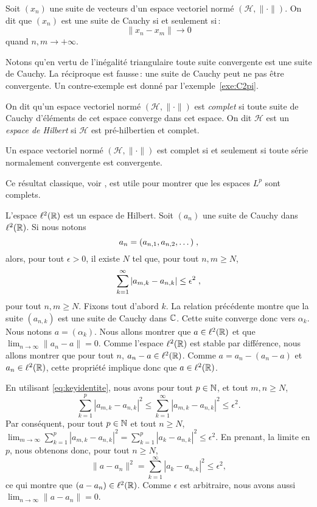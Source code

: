 \begin{definition}
  Soit $(x_n)$ une suite de vecteurs d'un espace vectoriel norm\'{e}
  $(\mathcal{H},\|\cdot\|)$. On dit que $(x_n)$ est une suite de Cauchy si et
  seulement si\,:
$$
\| x_n - x_m\| \rightarrow 0
$$
quand $n,m \rightarrow +\infty$.
\end{definition}
Notons qu'en vertu de l'in\'{e}galit\'{e} triangulaire toute suite
convergente est une suite de Cauchy. La r\'{e}ciproque est fausse\,:
une suite de Cauchy peut ne pas \^{e}tre convergente. Un
contre-exemple est donn\'{e} par l'exemple~\ref{exe:C2pi}.
\begin{definition}
  On dit qu'un espace vectoriel norm\'{e} $(\mathcal{H},\|\cdot\|)$ est
  \emph{complet} si toute suite de Cauchy d'\'{e}l\'{e}ments de cet espace converge
  dans cet espace. On dit $\mathcal{H}$ est un \emph{espace de Hilbert} si
  $\mathcal{H}$ est pr\'{e}-hilbertien et complet.
\end{definition}
\begin{proposition}
Un espace vectoriel norm\'{e} $(\mathcal{H},\|\cdot\|)$ est complet si et seulement
si toute s\'{e}rie normalement convergente est convergente.
\end{proposition}
Ce r\'{e}sultat classique, voir  \cite[proposition~5 du chapitre~6,
page~124]{royden:1988}, est utile pour montrer que les espaces $L^p$ sont complets.
\begin{example}
L'espace $\ell^2(\mathbb{R})$ est un espace de Hilbert. Soit $(a_n)$ une suite de Cauchy dans $\ell^2(\mathbb{R})$. Si nous notons
\[
a_n= (a_{n,1}, a_{n,2}, \dots ) \;,
\]
alors, pour tout $\epsilon > 0$, il existe $N$ tel que, pour tout $n,m \geq N$,
\begin{equation}
\label{eq:keyidentite}
\sum_{k=1}^\infty |a_{m,k}- a_{n,k}| \leq \epsilon^2 \;,
\end{equation}
pour tout $n,m \geq N$. Fixons tout d'abord $k$. La relation pr\'{e}c\'{e}dente montre
que la suite $(a_{n,k})$ est une suite de Cauchy dans $\mathbb{C}$.  Cette suite
converge donc vers $\alpha_k$. Nous notons $a = (\alpha_k)$. Nous allons
montrer que $a \in \ell^2(\mathbb{R})$ et que $\lim_{n \to \infty}\|a_n -a \|= 0$. Comme
l'espace $\ell^2(\mathbb{R})$ est stable par diff\'{e}rence, nous allons montrer que pour tout
$n$, $a_n -a \in \ell^2(\mathbb{R})$.  Comme $a = a_n - (a_n-a)$ et $a_n \in \ell^2(\mathbb{R})$, cette
propri\'{e}t\'{e} implique donc que $a \in \ell^2(\mathbb{R})$.

En utilisant \eqref{eq:keyidentite}, nous avons pour tout $p \in \mathbb{N}$, et tout $m,n \geq N$,
\[
\sum_{k=1}^p |a_{m,k} - a_{n,k} |^2 \leq \sum_{k=1}^\infty |a_{m,k} - a_{n,k}|^2 \leq \epsilon^2.
\]
Par cons\'{e}quent, pour tout $p \in \mathbb{N}$ et tout $n \geq N$,  $\lim_{m \to \infty} \sum_{k=1}^p |a_{m,k} - a_{n,k} |^2 =
\sum_{k=1}^p |a_k - a_{n,k}|^2 \leq \epsilon^2$. En prenant, la limite en $p$, nous obtenons donc, pour tout $n \geq N$,
\[
\|a - a_n\|^2 = \sum_{k=1}^\infty |a_k - a_{n,k}|^2 \leq \epsilon^2,
\]
ce qui montre que $(a - a_n) \in \ell^2(\mathbb{R})$. Comme $\epsilon$ est arbitraire, nous avons aussi $\lim_{n \to \infty} \|a - a_n\|= 0$.
\end{example}
